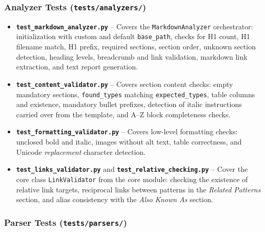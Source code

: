 \documentclass[12pt, a4paper]{article}
\begin{document}
\subsubsection*{Analyzer Tests (\texttt{tests/analyzers/})}

\begin{itemize}
    \item \textbf{\texttt{test\_markdown\_analyzer.py}} -- Covers the \texttt{MarkdownAnalyzer} 
    orchestrator: initialization with custom and default \texttt{base\_path}, checks for H1 
    count, H1 filename match, H1 prefix, required sections, section order, unknown section 
    detection, heading levels, breadcrumb and link validation, markdown link extraction, and text report generation.
    \item \textbf{\texttt{test\_content\_validator.py}} -- Covers section content checks: 
    empty mandatory sections, \texttt{found\_types} matching \texttt{expected\_types}, 
    table columns and existence, mandatory bullet prefixes, detection of italic 
    instructions carried over from the template, and A--Z block completeness checks.
    \item \textbf{\texttt{test\_formatting\_validator.py}} -- Covers low-level formatting 
    checks: unclosed bold and italic, images without alt text, table correctness, and 
    Unicode \emph{replacement} character detection.
    \item \textbf{\texttt{test\_links\_validator.py}} and \textbf{\texttt{test\_relative\_checking.py}} -- 
    Cover the core class \texttt{LinkValidator} from the core module: checking the existence of relative 
    link targets, reciprocal links between patterns in the \emph{Related Patterns} section, and alias 
    consistency with the \emph{Also Known As} section.
\end{itemize}

\subsubsection*{Parser Tests (\texttt{tests/parsers/})}
\end{document}
